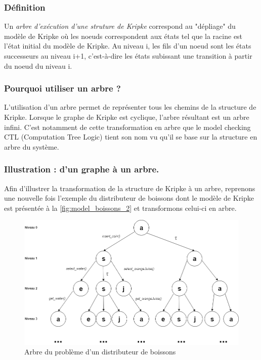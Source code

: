 \documentclass[runningheads,a4paper,10pt]{llncs}
\begin{document}
\subsubsection{Définition} 
Un \textit{arbre d'exécution d'une struture de Kripke} correspond au "dépliage" du modèle de Kripke où les noeuds correspondent aux états tel que la racine est l'état initial du modèle de Kripke. Au niveau i, les fils d'un noeud sont les états successeurs au niveau i+1, c'est-à-dire les états subissant une transition à partir du noeud du niveau i. 

\subsubsection{Pourquoi utiliser un arbre ?}
L'utilisation d'un arbre permet de représenter tous les chemins de la structure de Kripke. Lorsque le graphe de Kripke est cyclique, l'arbre résultant est un arbre infini. C'est notamment de cette transformation en arbre que le model checking CTL (Computation Tree Logic) tient son nom vu qu'il se base sur la structure en arbre du système. 

\subsubsection{Illustration : d'un graphe à un arbre.}

Afin d'illustrer la transformation de la structure de Kripke à un arbre, reprenons une nouvelle fois l'exemple du distributeur de boissons dont le modèle de Kripke est présentée à la \autoref{fig:model_boissons_2} et transformons celui-ci en arbre. 

\begin{figure}
  \centering
   \includegraphics[scale=0.5]{figures/Arbre_Distributeur.png}
   \caption[Caption for LOF]{Arbre du problème d'un distributeur de boissons}
   \label{fig:arbre_boissons}
\end{figure}
\end{document}
